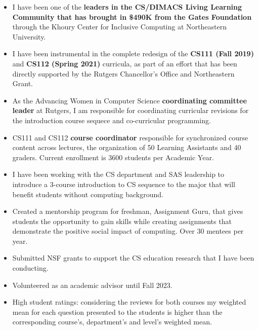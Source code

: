 \documentclass[11pt]{article}
\begin{document}
\begin{itemize}

  \item I have been one of the {\bf leaders in the CS/DIMACS Living
    Learning Community that has brought in \$490K from the Gates
    Foundation} through the Khoury Center for Inclusive Computing at
    Northeastern University.

  \item I have been instrumental in the complete redesign of the {\bf
    CS111 (Fall 2019)} and {\bf CS112 (Spring 2021)} curricula, as
    part of an effort that has been directly supported by the Rutgers
    Chancellor's Office and Northeastern Grant.
    
  \item As the Advancing Women in Computer Science {\bf coordinating
    committee leader} at Rutgers, I am responsible for coordinating
    curricular revisions for the introduction course sequece and
    co-curricular programming.

  \item CS111 and CS112 {\bf course coordinator} responsible for
    synchronized course content across lectures, the organization of
    50 Learning Assistants and 40 graders. Current enrollment is
    3600 students per Academic Year.

  \item I have been working with the CS department and SAS leadership
    to introduce a 3-course introduction to CS sequence to the major
    that will benefit students without computing background.
    
  \item Created a mentorship program for freshman, Assignment Guru,
    that gives students the opportunity to gain skills while creating
    assignments that demonstrate the positive social impact of
    computing. Over 30 mentees per year.
    
  \item Submitted NSF grants to support the CS education research that
    I have been conducting.
    
  \item Volunteered as an academic advisor until Fall 2023.

  \item High student ratings: considering the reviews for both courses
    my weighted mean for each question presented to the students is
    higher than the corresponding course's, department's and level's
    weighted mean.
  
\end{itemize}
\end{document}

